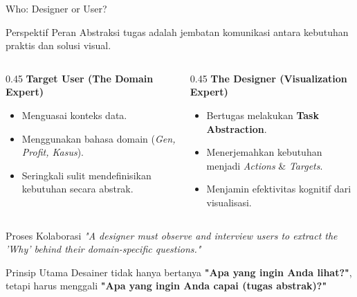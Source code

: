 \documentclass[t]{beamer}
\begin{document}
\begin{frame}{Who: Designer or User?}
    \begin{block}{Perspektif Peran}
        Abstraksi tugas adalah jembatan komunikasi antara kebutuhan praktis dan solusi visual.
    \end{block}
    \vspace{0.4cm}
    \begin{columns}[t]
        \begin{column}{0.45\textwidth}
            \textbf{Target User (The Domain Expert)}
            \begin{itemize}
                \item Menguasai konteks data.
                \item Menggunakan bahasa domain (\textit{Gen, Profit, Kasus}).
                \item Seringkali sulit mendefinisikan kebutuhan secara abstrak.
            \end{itemize}
        \end{column}
        
        \begin{column}{0.45\textwidth}
            \textbf{The Designer (Visualization Expert)}
            \begin{itemize}
                \item Bertugas melakukan \textbf{Task Abstraction}.
                \item Menerjemahkan kebutuhan menjadi \textit{Actions} \& \textit{Targets}.
                \item Menjamin efektivitas kognitif dari visualisasi.
            \end{itemize}
        \end{column}
    \end{columns}
\end{frame}

\begin{frame}{Proses Kolaborasi}
    \centering
    \textit{"A designer must observe and interview users to extract the 'Why' behind their domain-specific questions."}
    
    \vspace{0.5cm}
    \begin{exampleblock}{Prinsip Utama}
        Desainer tidak hanya bertanya \textbf{"Apa yang ingin Anda lihat?"}, \\
        tetapi harus menggali \textbf{"Apa yang ingin Anda capai (tugas abstrak)?"}
    \end{exampleblock}
\end{frame}
\end{document}
